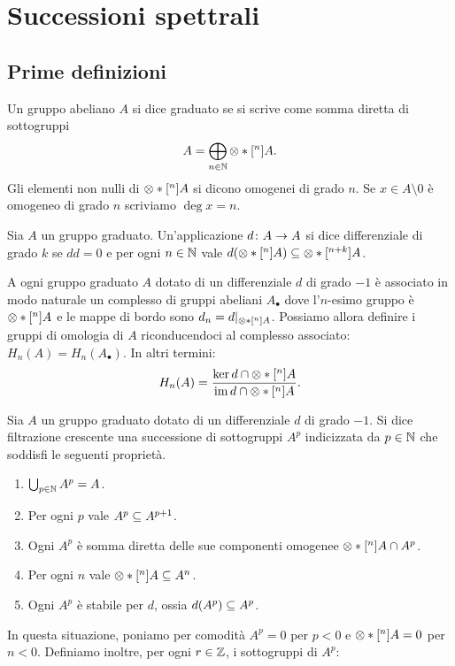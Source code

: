\chapter{Successioni spettrali}

\section{Prime definizioni}

\begin{definition}
Un gruppo abeliano $A$ si dice graduato se si scrive come somma diretta di sottogruppi
$$
A=\Dirsum_{n\in\NN}\pre{n}{A}.
$$
Gli elementi non nulli di $\pre{n}{A}$ si dicono omogenei di grado $n$. Se $x\in A\setminus0$ è omogeneo di grado $n$ scriviamo $\deg{x}=n$.
\end{definition}
\begin{definition}
Sia $A$ un gruppo graduato. Un'applicazione $d\colon A\to A$ si dice differenziale di grado $k$ se $dd=0$ e per ogni $n\in\mathbb{N}$ vale $d(\pre{n}{A})\subs\pre{n+k}{A}$.
\end{definition}
A ogni gruppo graduato $A$ dotato di un differenziale $d$ di grado $-1$ è associato in modo naturale un complesso di gruppi abeliani $A_\bullet$ dove l'$n$-esimo gruppo è $\pre{n}{A}$ e le mappe di bordo sono $d_n=d|_{\pre{n}{A}}$. Possiamo allora definire i gruppi di omologia di $A$ riconducendoci al complesso associato: $H_n(A)=H_n(A_\bullet)$. In altri termini:
$$
H_n(A)=\frac{\ker d\cap\pre{n}{A}}{\im d\cap\pre{n}{A}}.
$$
\begin{definition}
Sia $A$ un gruppo graduato dotato di un differenziale $d$ di grado $-1$. Si dice filtrazione crescente una successione di sottogruppi $A^p$ indicizzata da $p\in\mathbb{N}$ che soddisfi le seguenti proprietà.
\begin{enumerate}
\item $\bigcup_{p\in\mathbb{N}}A^p=A$.
\item Per ogni $p$ vale $A^p\subseteq A^{p+1}$.
\item Ogni $A^p$ è somma diretta delle sue componenti omogenee $\pre{n}{A}\cap A^p$.
\item\label{filtering-degree-total-degree} Per ogni $n$ vale $\pre{n}{A}\subs A^n$.
\item Ogni $A^p$ è stabile per $d$, ossia $d(A^p)\subseteq A^p$.
\end{enumerate}
\end{definition}
In questa situazione, poniamo per comodità $A^p=0$ per $p < 0$ e $\pre{n}{A}=0$ per $n<0$. Definiamo inoltre, per ogni $r\in\mathbb{Z}$, i sottogruppi di $A^p$:
